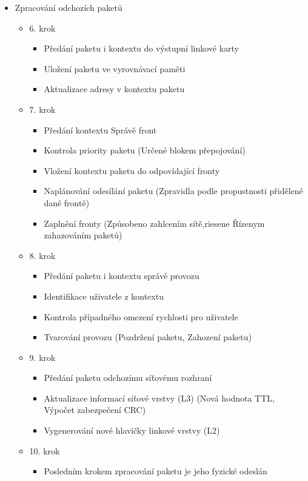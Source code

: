\begin{itemize}
\item Zpracování odchozích paketů
\begin{itemize}
\item 6. krok
\begin{itemize}
\item Předání paketu i kontextu do výstupní linkové karty
\item Uložení paketu ve vyrovnávací paměti
\item Aktualizace adresy v kontextu paketu
\end{itemize}
\item 7. krok
\begin{itemize}
\item Předání kontextu Správě front
\item Kontrola priority paketu (Určené blokem přepojování)
\item Vložení kontextu paketu do odpovídající fronty
\item Naplánování odesílání paketu (Zpravidla podle propustnosti přidělené dané frontě)
\item Zaplnění fronty (Způsobeno zahlcením sítě,riesene Řízenym zahazováním paketů)
\end{itemize}
\item 8. krok
\begin{itemize}
\item Předání paketu i kontextu správě provozu
\item Identifikace uživatele z kontextu
\item Kontrola případného omezení rychlosti pro uživatele
\item Tvarování provozu (Pozdržení paketu, Zahození paketu)
\end{itemize}
\item 9. krok
\begin{itemize}
\item Předání paketu odchozímu síťovému rozhraní
\item Aktualizace informací síťové vrstvy (L3) (Nová hodnota TTL, Výpočet zabezpečení CRC)
\item Vygenerování nové hlavičky linkové vrstvy (L2)
\end{itemize}
\item 10. krok
\begin{itemize}
\item Posledním krokem zpracování paketu je jeho fyzické odeslán
\end{itemize}
\end{itemize}
\end{itemize}
\newpage
